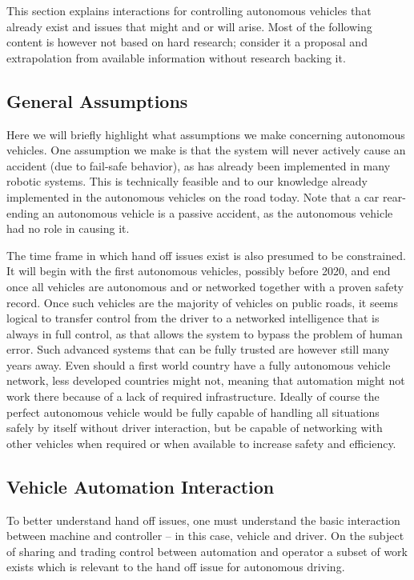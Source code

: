 \documentclass{acm_proc_article-sp}
\begin{document}
This section explains interactions for controlling autonomous vehicles that already exist and issues that might and or will arise.
Most of the following content is however not based on hard research; consider it a proposal and extrapolation from available information without research backing it.

\subsection{General Assumptions}

Here we will briefly highlight what assumptions we make concerning autonomous vehicles.
One assumption we make is that the system will never actively cause an accident (due to fail-safe behavior), as has already been implemented in many robotic systems.
This is technically feasible and to our knowledge already implemented in the autonomous vehicles on the road today.
Note that a car rear-ending an autonomous vehicle is a passive accident, as the autonomous vehicle had no role in causing it.

The time frame in which hand off issues exist is also presumed to be constrained.
It will begin with the first autonomous vehicles, possibly before 2020, and end once all vehicles are autonomous and or networked together with a proven safety record.
Once such vehicles are the majority of vehicles on public roads, it seems logical to transfer control from the driver to a networked intelligence that is always in full control, as that allows the system to bypass the problem of human error.
Such advanced systems that can be fully trusted are however still many years away.
Even should a first world country have a fully autonomous vehicle network, less developed countries might not, meaning that automation might not work there because of a lack of required infrastructure.
Ideally of course the perfect autonomous vehicle would be fully capable of handling all situations safely by itself without driver interaction, but be capable of networking with other vehicles when required or when available to increase safety and efficiency.

\subsection{Vehicle Automation Interaction}

To better understand hand off issues, one must understand the basic interaction between machine and controller – in this case, vehicle and driver.
On the subject of sharing and trading control between automation and operator a subset of work exists which is relevant to the hand off issue for autonomous driving.
\end{document}
